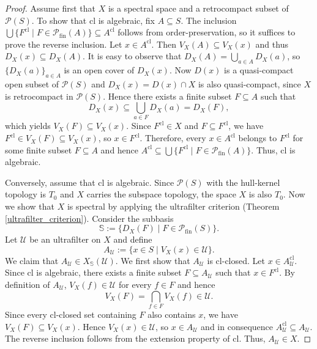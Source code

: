 \documentclass[10pt,a4paper]{amsart}
\begin{document}
\begin{proof}
    Assume first that $X$ is a spectral space and a retrocompact subset of $\mathcal{P}(S)$. To show that $\mathrm{cl}$ is algebraic, fix $A \subseteq S$. The inclusion $\bigcup\{F^\mathrm{cl} \mid F \in \mathcal{P}_\mathrm{fin}(A)\} \subseteq A^\mathrm{cl}$ follows from order-preservation, so it suffices to prove the reverse inclusion. Let $x\in A^\mathrm{cl}$. Then $V_X(A) \subseteq V_X(x)$ and thus $D_X(x) \subseteq D_X(A)$. It is easy to observe that $D_X(A) = \bigcup_{a \in A}D_X(a)$, so $\{D_X(a)\}_{a \in A}$ is an open cover of $D_X(x)$. Now $D(x)$ is a quasi-compact open subset of $\mathcal{P}(S)$ and $D_X(x) = D(x) \cap X$ is also quasi-compact, since $X$ is retrocompact in $\mathcal{P}(S)$. Hence there exists a finite subset $F \subseteq A$ such that 
    \begin{equation*}
        D_X(x) \subseteq \bigcup_{a \in F} D_X(a) = D_X(F), 
    \end{equation*}
    which yields $V_X(F) \subseteq V_X(x)$. Since $F^\mathrm{cl} \in X$ and $F \subseteq F^\mathrm{cl}$, we have $F^\mathrm{cl} \in V_X(F) \subseteq V_X(x)$, so $x \in F^\mathrm{cl}$. Therefore, every $x \in A^\mathrm{cl}$ belongs to $F^\mathrm{cl}$ for some finite subset $F \subseteq A$ and hence $A^\mathrm{cl} \subseteq \bigcup\{F^\mathrm{cl} \mid F \in \mathcal{P}_\mathrm{fin}(A)\}$. Thus, $\mathrm{cl}$ is algebraic. 
    
    Conversely, assume that $\mathrm{cl}$ is algebraic. Since $\mathcal{P}(S)$ with the hull-kernel topology is $T_0$ and $X$ carries the subspace topology, the space $X$ is also $T_0$. Now we show that $X$ is spectral by applying the ultrafilter criterion (Theorem \ref{ultrafilter_criterion}). Consider the subbasis $$\mathbb{S} := \{D_X(F) \mid F \in\mathcal{P}_\mathrm{fin}(S)\}.$$ Let $\mathscr{U}$ be an ultrafilter on $X$ and define $$A_\mathscr{U} := \{x \in S \mid V_X(x) \in \mathscr{U}\}.$$ We claim that $A_\mathscr{U} \in X_\mathbb{S}(\mathscr{U})$. We first show that $A_\mathscr{U}$ is $\mathrm{cl}$-closed. Let $x \in A_\mathscr{U}^\mathrm{cl}$. Since $\mathrm{cl}$ is algebraic, there exists a finite subset $F \subseteq A_\mathscr{U}$ such that $x \in F^\mathrm{cl}$. By definition of $A_\mathscr{U}$, $V_X(f) \in \mathscr{U}$ for every $f \in F$ and hence $$V_X(F) = \bigcap_{f \in F} V_X(f) \in \mathscr{U}.$$ Since every $\mathrm{cl}$-closed set containing $F$ also contains $x$, we have $V_X(F) \subseteq V_X(x)$. Hence $V_X(x) \in \mathscr{U}$, so $x \in A_\mathscr{U}$ and in consequence $A_\mathscr{U}^\mathrm{cl} \subseteq A_\mathscr{U}$. The reverse inclusion follows from the extension property of $\mathrm{cl}$. Thus, $A_\mathscr{U} \in X$. 
    

\end{proof}
\end{document}
